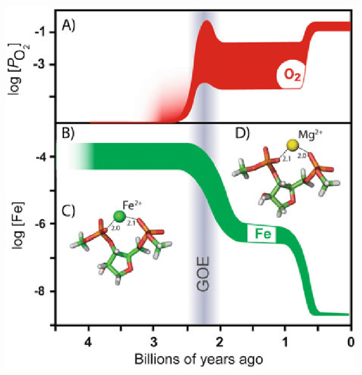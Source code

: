 \documentclass[10pt]{article}
\begin{document}
\begin{center}
    \includegraphics*[scale=0.3]{L2_18.png} 
\end{center}
\end{document}
